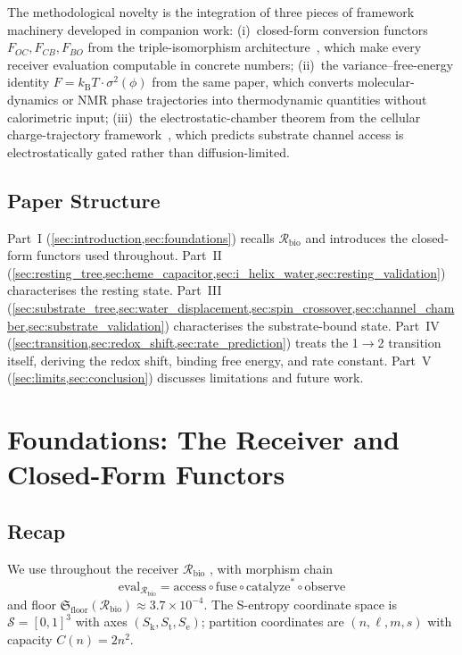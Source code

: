 \documentclass[11pt,twocolumn,a4paper]{article}
\theoremstyle{definition}
\theoremstyle{remark}
\newcommand{\kB}{k_{\mathrm{B}}}
\newcommand{\Sk}{S_{\mathrm{k}}}
\newcommand{\St}{S_{\mathrm{t}}}
\newcommand{\Se}{S_{\mathrm{e}}}
\newcommand{\Sspace}{\mathcal{S}}
\newcommand{\Recv}{\mathcal{R}}
\newcommand{\Floor}{\mathfrak{S}_{\mathrm{floor}}}
\newcommand{\eval}{\mathrm{eval}}
\begin{document}
The methodological novelty is the integration of three pieces of framework machinery developed in companion work: (i)~closed-form conversion functors $F_{OC}, F_{CB}, F_{BO}$ from the triple-isomorphism architecture~\citep{sachikonye2025_isomorphism}, which make every receiver evaluation computable in concrete numbers; (ii)~the variance--free-energy identity $F = \kB T \cdot \sigma^2(\phi)$ from the same paper, which converts molecular-dynamics or NMR phase trajectories into thermodynamic quantities without calorimetric input; (iii)~the electrostatic-chamber theorem from the cellular charge-trajectory framework~\citep{sachikonye2025_charge}, which predicts substrate channel access is electrostatically gated rather than diffusion-limited.

\subsection{Paper Structure}

Part~I (\cref{sec:introduction,sec:foundations}) recalls $\Recv_{\mathrm{bio}}$ and introduces the closed-form functors used throughout. Part~II (\cref{sec:resting_tree,sec:heme_capacitor,sec:i_helix_water,sec:resting_validation}) characterises the resting state. Part~III (\cref{sec:substrate_tree,sec:water_displacement,sec:spin_crossover,sec:channel_chamber,sec:substrate_validation}) characterises the substrate-bound state. Part~IV (\cref{sec:transition,sec:redox_shift,sec:rate_prediction}) treats the 1$\to$2 transition itself, deriving the redox shift, binding free energy, and rate constant. Part~V (\cref{sec:limits,sec:conclusion}) discusses limitations and future work.

\section{Foundations: The Receiver and Closed-Form Functors}
\label{sec:foundations}

\subsection{Recap}

We use throughout the receiver $\Recv_{\mathrm{bio}}$ \citep{sachikonye2025_paper1}, with morphism chain
\begin{equation}
\eval_{\Recv_{\mathrm{bio}}} = \mathrm{access} \circ \mathrm{fuse} \circ \mathrm{catalyze}^* \circ \mathrm{observe}
\label{eq:morphism_chain}
\end{equation}
and floor $\Floor(\Recv_{\mathrm{bio}}) \approx 3.7 \times 10^{-4}$. The S-entropy coordinate space is $\Sspace = [0,1]^3$ with axes $(\Sk, \St, \Se)$; partition coordinates are $(n, \ell, m, s)$ with capacity $C(n) = 2n^2$.
\end{document}

